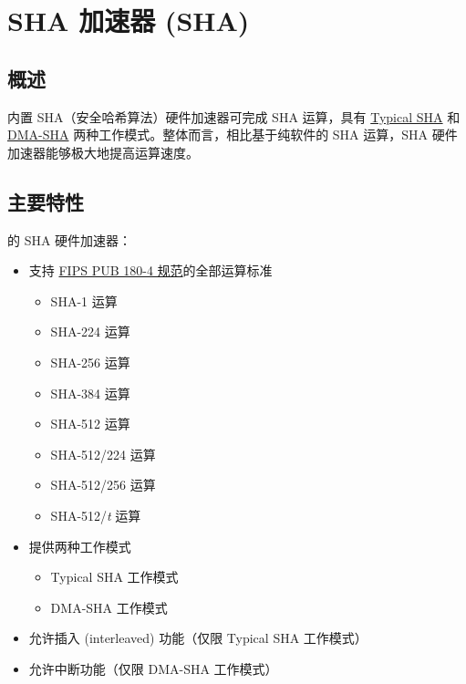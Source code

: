 \documentclass[main\_\_CN.tex]{subfiles}
\begin{document}

\ifglobal
\else
    {\let\clearpage\relax \listoftodos}
    \tableofcontents
\fi



\hypertarget{sha}{}
\chapter{SHA 加速器 (SHA)} \label{mod:sha}

\section{概述}

\chipname{} 内置 SHA（安全哈希算法）硬件加速器可完成 SHA 运算，具有 \hyperref[sec:sha-typical-sha]{Typical SHA} 和 \hyperref[sec:sha-dma-sha]{DMA-SHA} 两种工作模式。整体而言，相比基于纯软件的 SHA 运算，SHA 硬件加速器能够极大地提高运算速度。

\section{主要特性}

\chipname{} 的 SHA 硬件加速器：

\begin{itemize}
    \item 支持 \href{https://doi.org/10.6028/NIST.FIPS.180-4}{FIPS PUB 180-4 规范}的全部运算标准
    \begin{itemize}
        \item SHA-1 运算
        \item SHA-224 运算
        \item SHA-256 运算
        \item SHA-384 运算
        \item SHA-512 运算
        \item SHA-512/224 运算
        \item SHA-512/256 运算
        \item SHA-512/{\it{t}} 运算
    \end{itemize}
    \item 提供两种工作模式
    \begin{itemize}
        \item Typical SHA 工作模式
        \item DMA-SHA 工作模式
    \end{itemize}
    \item 允许插入 (interleaved) 功能（仅限 Typical SHA 工作模式）
    \item 允许中断功能（仅限 DMA-SHA 工作模式）
\end{itemize}
\end{document}
